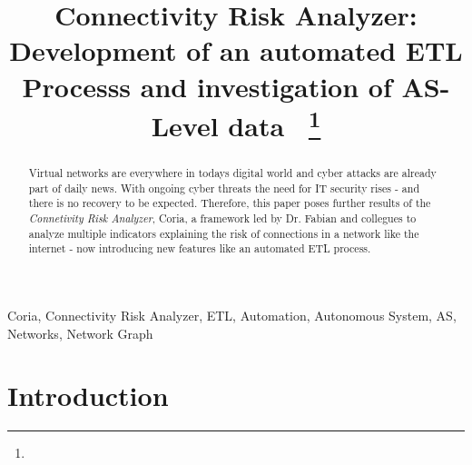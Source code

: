 \documentclass[conference, 11pt]{IEEEtran}
\begin{document}
			  
			  
\title{Connectivity Risk Analyzer: Development of an automated ETL Processs and investigation of AS-Level data\
{\footnotesize \textsuperscript{}}
\thanks{}
}

\author{
\and
{}

}

\maketitle
\thispagestyle{plain}
\pagestyle{plain}



\begin{abstract}

Virtual networks are everywhere in todays digital world and cyber attacks are already part of daily news. With ongoing cyber threats the need for IT security rises - and there is no recovery to be expected. Therefore, this paper poses further results of the \textit{Connetivity Risk Analyzer}, Coria, a framework led by Dr. Fabian and collegues to analyze multiple indicators explaining the risk of connections in a network like the internet - now introducing new features like an automated ETL process.

\end{abstract}

\begin{IEEEkeywords}
Coria, Connectivity Risk Analyzer, ETL, Automation, Autonomous System, AS, Networks, Network Graph
\end{IEEEkeywords}


\section{Introduction}
\end{document}
